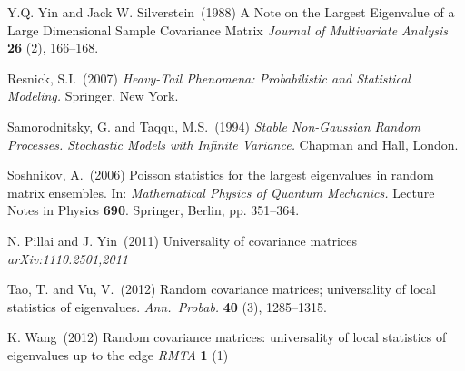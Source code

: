 \documentclass[11pt,reqno]{amsart}
\newcommand{\1}{\mathds{1}}
\newcommand{\0}{\boldsymbol{0}}
\newcommand{\4}{\mathchoice{\mskip1.5mu}{\mskip1.5mu}{}{}}
\newcommand{\5}{\mathchoice{\mskip-1.5mu}{\mskip-1.5mu}{}{}}
\newcommand{\2}{\penalty250\mskip\thickmuskip\mskip-\thinmuskip} %
\begin{document}
\begin{thebibliography}{99}
{\sc Y.Q. Yin and Jack W. Silverstein}\ (1988)
A Note on the Largest Eigenvalue of a Large Dimensional Sample
Covariance Matrix
{\em Journal of Multivariate Analysis} {\bf 26} (2), 166--168.

{\sc Resnick, S.I.}\ (2007)
{\em Heavy-Tail Phenomena: Probabilistic and Statistical Modeling.}
Springer, New York.


{\sc Samorodnitsky, G. and Taqqu, M.S.}\ (1994)
{\em Stable Non-Gaussian Random Processes.
Stochastic Models with Infinite Variance.} Chapman and Hall, London.


{\sc Soshnikov, A.}\ (2006)
Poisson statistics for the largest eigenvalues in random matrix
ensembles.
In: {\em Mathematical Physics of Quantum Mechanics.} Lecture Notes in
Physics {\bf 690}. Springer, Berlin, pp. 351--364.

{\sc N. Pillai and J. Yin}\ (2011)
Universality of covariance matrices
{\em arXiv:1110.2501,2011}

{\sc Tao, T. and Vu, V.}\ (2012)
Random covariance matrices; universality of local statistics of eigenvalues.
{\em Ann.~Probab.} {\bf 40} (3), 1285--1315.

{\sc K. Wang}\ (2012)
Random covariance matrices: universality of local statistics of
eigenvalues up to the edge
{\em RMTA} {\bf 1} (1)

\end{thebibliography}
\end{document}
